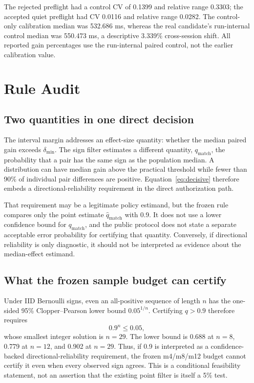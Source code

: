 \documentclass[10pt]{article}
\newcommand{\RealControlMs}{550.473}
\newcommand{\QMinimumN}{29}
\begin{document}
The rejected preflight had a control CV of 0.1399 and relative range 0.3303;
the accepted quiet preflight had CV 0.0116 and relative range 0.0282.  The
control-only calibration median was 532.686 ms, whereas the real candidate's
run-internal control median was \RealControlMs{} ms, a descriptive 3.339\%
cross-session shift.  All reported gain percentages use the run-internal
paired control, not the earlier calibration value.

\section{Rule Audit}

\subsection{Two quantities in one direct decision}

The interval margin addresses an effect-size quantity: whether the median
paired gain exceeds $\delta_{\min}$.  The sign filter estimates a different
quantity, $q_{\mathrm{match}}$, the probability that a pair has the same sign
as the population median.  A distribution can have median gain above the
practical threshold while fewer than 90\% of individual pair differences are
positive.  Equation~\ref{eq:decisive} therefore embeds a directional-reliability
requirement in the direct authorization path.

That requirement may be a legitimate policy estimand, but the frozen rule
compares only the point estimate $\widehat q_{\mathrm{match}}$ with 0.9.  It
does not use a lower confidence bound for $q_{\mathrm{match}}$, and the public
protocol does not state a separate acceptable error probability for certifying
that quantity.  Conversely, if directional reliability is only diagnostic,
it should not be interpreted as evidence about the median-effect estimand.

\subsection{What the frozen sample budget can certify}

Under IID Bernoulli signs, even an all-positive sequence of length $n$ has the
one-sided 95\% Clopper--Pearson lower bound $0.05^{1/n}$.  Certifying
$q>0.9$ therefore requires
\begin{equation}
  0.9^n\le0.05,
\end{equation}
whose smallest integer solution is $n=\QMinimumN$.  The lower bound is 0.688
at $n=8$, 0.779 at $n=12$, and 0.902 at $n=29$.  Thus, if 0.9 is interpreted as
a confidence-backed directional-reliability requirement, the frozen m4/m8/m12
budget cannot certify it even when every observed sign agrees.  This is a
conditional feasibility statement, not an assertion that the existing point
filter is itself a 5\% test.
\end{document}

